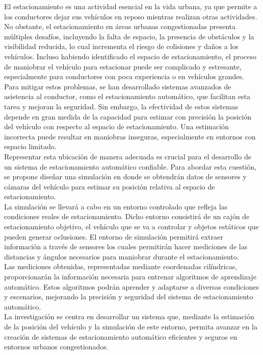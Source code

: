 
El estacionamiento es una actividad esencial en la vida urbana, ya que permite a los conductores dejar sus vehículos en reposo mientras realizan otras actividades.
No obstante, el estacionamiento en áreas urbanas congestionadas presenta múltiples desafíos, incluyendo la falta de espacio,
la presencia de obstáculos y la visibilidad reducida, lo cual incrementa el riesgo de colisiones y daños a los vehículos.
Incluso habiendo identificado el espacio de estacionamiento, el proceso de maniobrar el vehículo para estacionar puede ser complicado y estresante,
especialmente para conductores con poca experiencia o en vehículos grandes.\\

Para mitigar estos problemas, se han desarrollado sistemas avanzados de asistencia al conductor, como el estacionamiento automático,
que facilitan esta tarea y mejoran la seguridad.
Sin embargo, la efectividad de estos sistemas depende en gran medida de la capacidad para estimar con precisión la posición del vehículo
con respecto al espacio de estacionamiento.
Una estimación incorrecta puede resultar en maniobras inseguras, especialmente en entornos con espacio limitado.\\

Representar esta ubicación de manera adecuada es crucial para el desarrollo de un sistema de estacionamiento automático confiable.
Para abordar esta cuestión, se propone diseñar una simulación en donde se obtendrán datos de sensores
y cámaras del vehículo para estimar su posición relativa al espacio de estacionamiento.\\

La simulación se llevará a cabo en un entorno controlado que refleja las condiciones reales de estacionamiento.
Dicho entorno consistirá de un cajón de estacionamiento objetivo, el vehículo que se va a controlar y objetos estáticos que pueden generar oclusiones.
El entorno de simulación permitirá extraer información a través de sensores los cuales permitirán hacer mediciones de las distancias y ángulos necesarios para maniobrar durante el estacionamiento.\\

Las mediciones obtenidas, representadas mediante coordenadas cilíndricas, proporcionarán la información necesaria para entrenar algoritmos de aprendizaje automático.
Estos algoritmos podrán aprender y adaptarse a diversas condiciones y escenarios, mejorando la precisión y seguridad del sistema de estacionamiento automático.\\

La investigación se centra en desarrollar un sistema que, mediante la estimación de la posición del vehículo y la simulación de este entorno, permita avanzar en la creación de sistemas de estacionamiento automático eficientes y seguros en entornos urbanos congestionados.